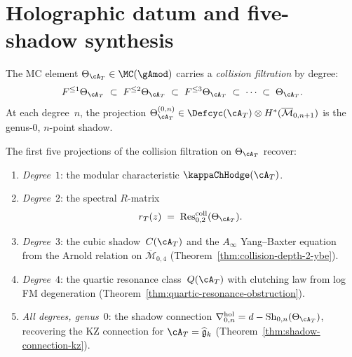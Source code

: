 \section{Holographic datum and five-shadow synthesis}
\label{sec:ht-holographic-datum}

\begin{definition}
\label{def:ht-collision-filtration}
The MC element $\Theta_{\cA_T} \in \MC(\gAmod)$ carries a
\emph{collision filtration} by degree:
\begin{equation}\label{eq:ht-collision-filtration}
F^{\leq 1} \Theta_{\cA_T}
\;\subset\; F^{\leq 2} \Theta_{\cA_T}
\;\subset\; F^{\leq 3} \Theta_{\cA_T}
\;\subset\; \cdots
\;\subset\; \Theta_{\cA_T}.
\end{equation}
At each degree~$n$, the projection
$\Theta_{\cA_T}^{(0,n)} \in
\Defcyc(\cA_T) \otimes H^*(\overline{\mathcal{M}}_{0,n+1})$
is the genus-$0$, $n$-point shadow.
\end{definition}

\begin{proposition}
\label{prop:ht-five-shadow-synthesis}
The first five projections of the collision filtration on
$\Theta_{\cA_T}$ recover:
\begin{enumerate}[label=\textup{(\roman*)}]
\item \emph{Degree~$1$}: the modular characteristic
 $\kappaChHodge(\cA_T)$.
\item \emph{Degree~$2$}: the spectral $R$-matrix
 \begin{equation}\label{eq:ht-r-matrix-collision}
 r_T(z)
 \;=\; \operatorname{Res}^{\mathrm{coll}}_{0,2}(\Theta_{\cA_T}).
 \end{equation}
\item \emph{Degree~$3$}: the cubic shadow~$C(\cA_T)$ and the
 $A_\infty$ Yang--Baxter equation from the Arnold relation on
 $\overline{\mathcal{M}}_{0,4}$
 \textup{(}Theorem~\textup{\ref{thm:collision-depth-2-ybe}}\textup{)}.
\item \emph{Degree~$4$}: the quartic resonance
 class~$Q(\cA_T)$ with clutching law from log FM degeneration
 \textup{(}Theorem~\textup{\ref{thm:quartic-resonance-obstruction}}\textup{)}.
\item \emph{All degrees, genus~$0$}: the shadow connection
 $\nabla^{\mathrm{hol}}_{0,n} = d -
 \operatorname{Sh}_{0,n}(\Theta_{\cA_T})$, recovering the
 KZ connection for $\cA_T = \widehat{\mathfrak{g}}_k$
 \textup{(}Theorem~\textup{\ref{thm:shadow-connection-kz}}\textup{)}.
\end{enumerate}
\end{proposition}

